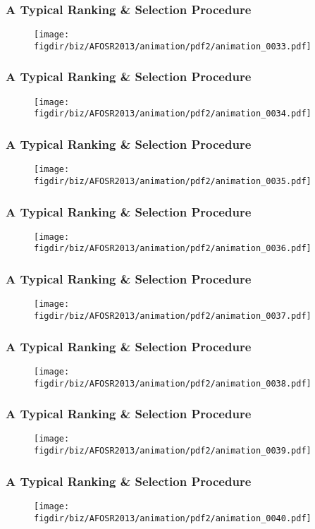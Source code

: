 \documentclass[13pt]{beamer}
\newcommand{\figdir}{../../fig}
\begin{document}
{\begin{frame}\frametitle{A Typical Ranking \& Selection Procedure}\begin{figure}\texttt{[image: \\figdir/biz/AFOSR2013/animation/pdf2/animation\_0033.pdf]}\end{figure}\end{frame}
\begin{frame}\frametitle{A Typical Ranking \& Selection Procedure}\begin{figure}\texttt{[image: \\figdir/biz/AFOSR2013/animation/pdf2/animation\_0034.pdf]}\end{figure}\end{frame}
\begin{frame}\frametitle{A Typical Ranking \& Selection Procedure}\begin{figure}\texttt{[image: \\figdir/biz/AFOSR2013/animation/pdf2/animation\_0035.pdf]}\end{figure}\end{frame}
\begin{frame}\frametitle{A Typical Ranking \& Selection Procedure}\begin{figure}\texttt{[image: \\figdir/biz/AFOSR2013/animation/pdf2/animation\_0036.pdf]}\end{figure}\end{frame}
\begin{frame}\frametitle{A Typical Ranking \& Selection Procedure}\begin{figure}\texttt{[image: \\figdir/biz/AFOSR2013/animation/pdf2/animation\_0037.pdf]}\end{figure}\end{frame}
\begin{frame}\frametitle{A Typical Ranking \& Selection Procedure}\begin{figure}\texttt{[image: \\figdir/biz/AFOSR2013/animation/pdf2/animation\_0038.pdf]}\end{figure}\end{frame}
\begin{frame}\frametitle{A Typical Ranking \& Selection Procedure}\begin{figure}\texttt{[image: \\figdir/biz/AFOSR2013/animation/pdf2/animation\_0039.pdf]}\end{figure}\end{frame}
\begin{frame}\frametitle{A Typical Ranking \& Selection Procedure}\begin{figure}\texttt{[image: \\figdir/biz/AFOSR2013/animation/pdf2/animation\_0040.pdf]}\end{figure}\end{frame}
}
\end{document}
